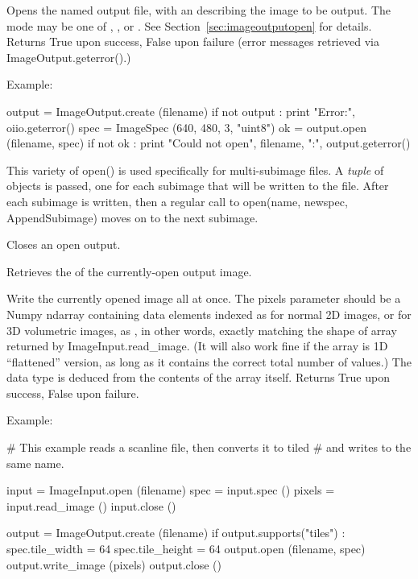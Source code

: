 Opens the named output file, with an \ImageSpec describing the image to
be output.  The {\cf mode} may be one of , ,
or .
See Section~\ref{sec:imageoutputopen} for details.  Returns {\cf True}
upon success, {\cf False} upon failure (error messages retrieved via
{\cf ImageOutput.geterror()}.)

\noindent Example:
\begin{code}
    output = ImageOutput.create (filename)
    if not output :
        print "Error:", oiio.geterror()
    spec = ImageSpec (640, 480, 3, "uint8")
    ok = output.open (filename, spec)
    if not ok :
        print "Could not open", filename, ":", output.geterror()
\end{code}
\apiend

This variety of {\cf open()} is used specifically for multi-subimage files.
A \emph{tuple} of \ImageSpec objects is passed, one for each subimage
that will be written to the file.  After each subimage is written, then
a regular call to {\cf open(name, newspec, {\ce AppendSubimage})} moves
on to the next subimage.
\apiend

Closes an open output.
\apiend

Retrieves the \ImageSpec of the currently-open output image.
\apiend

Write the currently opened image all at once.  The {\cf pixels} parameter
should be a Numpy {\cf ndarray} containing data elements indexed as
{\cf [y][x][channel]} for normal 2D images, or for 3D volumetric images,
as {\cf [z][y][x][channel]}, in other words, exactly matching the shape of
array returned by {\cf ImageInput.read_image}. (It will also work fine if
the array is 1D ``flattened'' version, as long as it contains the correct
total number of values.) The data type is deduced from the contents of the
array itself. Returns {\cf True} upon success, {\cf False} upon failure.

\noindent Example:
\begin{code}
    # This example reads a scanline file, then converts it to tiled
    # and writes to the same name.

    input = ImageInput.open (filename)
    spec = input.spec ()
    pixels = input.read_image ()
    input.close ()

    output = ImageOutput.create (filename)
    if output.supports("tiles") :
        spec.tile_width = 64
        spec.tile_height = 64
        output.open (filename, spec)
        output.write_image (pixels)
        output.close ()
\end{code}
\apiend

